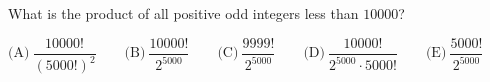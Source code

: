 What is the product of all positive odd integers less than $10000$?

$\text{(A)}\ \dfrac{10000!}{(5000!)^2}\qquad\text{(B)}\ \dfrac{10000!}{2^{5000}}\qquad\text{(C)}\ \dfrac{9999!}{2^{5000}}\qquad\text{(D)}\ \dfrac{10000!}{2^{5000}\cdot5000!}\qquad\text{(E)}\ \dfrac{5000!}{2^{5000}}$

